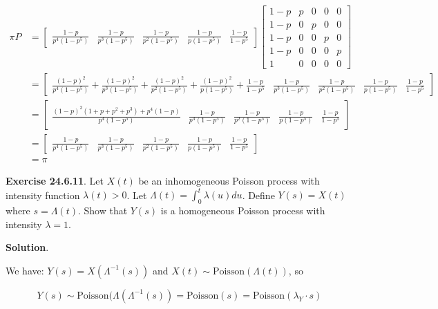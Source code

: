 \begin{align*}
\pi P &= \begin{bmatrix} \frac{1 - p}{p^{4}(1 - p^{5})} &
\frac{1 - p}{p^{3}(1 - p^{5})} &
\frac{1 - p}{p^{2}(1 - p^{5})} &
\frac{1 - p}{p(1 - p^{5})} &
\frac{1 - p}{1 - p^{5}}
\end{bmatrix}
\begin{bmatrix}
1 - p & p & 0 & 0 & 0 \\
1 - p & 0 & p & 0 & 0 \\
1 - p & 0 & 0 & p & 0 \\
1 - p & 0 & 0 & 0 & p \\
1 & 0 & 0 & 0 & 0
\end{bmatrix} \\
&= \begin{bmatrix} 
\frac{(1 - p)^{2}}{p^{4}(1 - p^{5})}
+ \frac{(1 - p)^{2}}{p^{3}(1 - p^{5})}
+ \frac{(1 - p)^{2}}{p^{2}(1 - p^{5})}
+ \frac{(1 - p)^{2}}{p(1 - p^{5})}
+ \frac{1 - p}{1 - p^{5}} &
\frac{1 - p}{p^{3}(1 - p^{5})} &
\frac{1 - p}{p^{2}(1 - p^{5})} &
\frac{1 - p}{p(1 - p^{5})} &
\frac{1 - p}{1 - p^{5}}
\end{bmatrix} \\
&= \begin{bmatrix} 
\frac{(1 - p)^{2}(1 + p + p^{2} + p^{3}) + p^{4}(1 - p)}{p^{4}(1 - p^{5})} &
\frac{1 - p}{p^{3}(1 - p^{5})} &
\frac{1 - p}{p^{2}(1 - p^{5})} &
\frac{1 - p}{p(1 - p^{5})} &
\frac{1 - p}{1 - p^{5}}
\end{bmatrix} \\
&= \begin{bmatrix} 
\frac{1 - p}{p^{4}(1 - p^{5})} &
\frac{1 - p}{p^{3}(1 - p^{5})} &
\frac{1 - p}{p^{2}(1 - p^{5})} &
\frac{1 - p}{p(1 - p^{5})} &
\frac{1 - p}{1 - p^{5}}
\end{bmatrix} \\
&= \pi
\end{align*}

\textbf{Exercise 24.6.11}. Let \(X(t)\) be an inhomogeneous Poisson
process with intensity function \(\lambda(t) > 0\). Let
\(\Lambda(t) = \int_{0}^t \lambda(u) du\). Define \(Y(s) = X(t)\) where
\(s = \Lambda(t)\). Show that \(Y(s)\) is a homogeneous Poisson process
with intensity \(\lambda = 1\).

\textbf{Solution}.

We have: \(Y(s) = X(\Lambda^{-1}(s))\) and
\(X(t) \sim \text{Poisson}(\Lambda(t))\), so

\[Y(s) \sim \text{Poisson}(\Lambda(\Lambda^{-1}(s)) = \text{Poisson}(s) = \text{Poisson}(\lambda_Y \cdot s)\]

